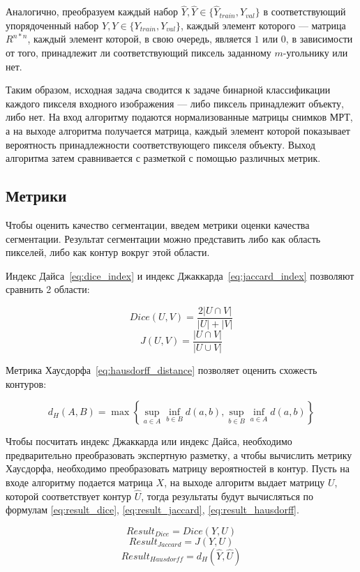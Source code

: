 Аналогично, преобразуем каждый набор $\hat{Y},\hat{Y}\in{}\{\hat{Y}_{train},\hat{Y}_{val}\}$ в соответствующий упорядоченный набор $Y,Y\in{}\{Y_{train},Y_{val}\}$, каждый элемент которого — матрица $R^{n*n}$, каждый элемент которой, в свою очередь, является $1$ или $0$, в зависимости от того, принадлежит ли соответствующий пиксель заданному \mbox{$m$-угольнику} или нет.

Таким образом, исходная задача сводится к задаче бинарной классификации каждого пикселя входного изображения — либо пиксель принадлежит объекту, либо нет. На вход алгоритму подаются нормализованные матрицы снимков МРТ, а на выходе алгоритма получается матрица, каждый элемент которой показывает вероятность принадлежности соответствующего пикселя объекту. Выход алгоритма затем сравнивается с разметкой с помощью различных метрик.

\subsection{Метрики}

Чтобы оценить качество сегментации, введем метрики оценки качества сегментации. Результат сегментации можно представить либо как область пикселей, либо как контур вокруг этой области. 

Индекс Дайса~\eqref{eq:dice_index} и индекс Джаккарда~\eqref{eq:jaccard_index} позволяют сравнить 2 области:

\begin{equation}\label{eq:dice_index}
  Dice(U,V) = \frac{2|U\cap{}V|}{|U| + |V|}
\end{equation}
\begin{equation}\label{eq:jaccard_index}
  J(U,V) = \frac{|U\cap{}V|}{|U\cup{}V|}
\end{equation}

Метрика Хаусдорфа~\eqref{eq:hausdorff_distance} позволяет оценить схожесть контуров:

\begin{equation}\label{eq:hausdorff_distance}
  d_{H}(A,B)=\max\left\{\sup_{a\in{}A}\inf_{b\in{}B}d(a,b),\sup_{b\in{}B}\inf_{a\in{}A}d(a,b)\right\}
\end{equation}

\clearpage
Чтобы посчитать индекс Джаккарда или индекс Дайса, необходимо 
предварительно преобразовать экспертную разметку, а чтобы 
вычислить метрику Хаусдорфа, необходимо преобразовать матрицу 
вероятностей в контур. Пусть на входе алгоритму подается 
матрица $X$, на выходе алгоритм выдает матрицу $U$, которой
соответствует контур $\hat{U}$, тогда результаты будут 
вычисляться по формулам \eqref{eq:result_dice}, \eqref{eq:result_jaccard}, \eqref{eq:result_hausdorff}.

\begin{equation}\label{eq:result_dice}
  Result_{Dice} = Dice(Y, U)
\end{equation}
\begin{equation}\label{eq:result_jaccard}
  Result_{Jaccard} = J(Y, U)
\end{equation}
\begin{equation}\label{eq:result_hausdorff}
  Result_{Hausdorff} = d_{H}(\hat{Y}, \hat{U})
\end{equation}

